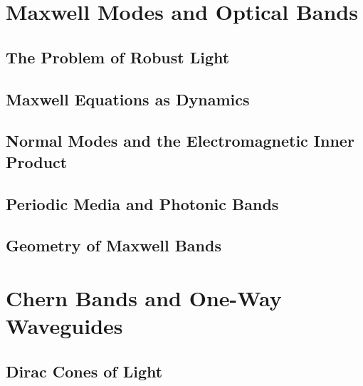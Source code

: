 \documentclass[11pt,twoside,openright]{book}
\theoremstyle{plain}
\theoremstyle{definition}
\theoremstyle{remark}
\begin{document}
\tableofcontents
\cleardoublepage





\mainmatter

\part{Maxwell Modes and Optical Bands}

\chapter{The Problem of Robust Light}
\label{ch:robust-light}


\chapter{Maxwell Equations as Dynamics}
\label{ch:maxwell-dynamics}


\chapter{Normal Modes and the Electromagnetic Inner Product}
\label{ch:normal-modes}


\chapter{Periodic Media and Photonic Bands}
\label{ch:periodic-media}


\chapter{Geometry of Maxwell Bands}
\label{ch:geometry-bands}


\part{Chern Bands and One-Way Waveguides}

\chapter{Dirac Cones of Light}
\label{ch:dirac-cones}

\end{document}
